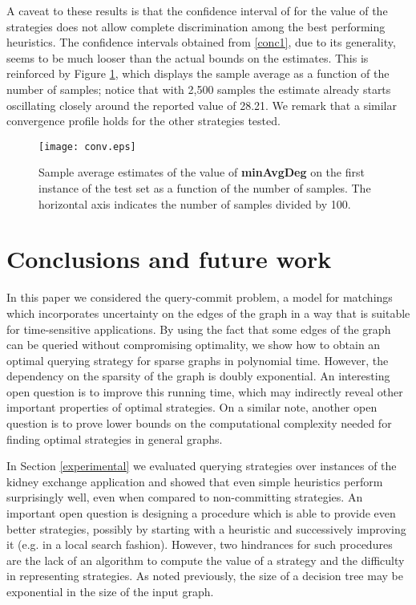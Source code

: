 \documentclass[12pt]{article}
\begin{document}
		A caveat to these results is that the confidence interval of  for the value of the strategies does not allow complete discrimination among the best performing heuristics. The confidence intervals obtained from \eqref{conc1}, due to its generality, seems to be much looser than the actual bounds on the estimates. This is reinforced by Figure \ref{fig:conv}, which displays the sample average as a function of the number of samples; notice that with 2,500 samples the estimate already starts oscillating closely around the reported value of 28.21. We remark that a similar convergence profile holds for the other strategies tested.
		
		
\begin{figure}
	\centering
		\texttt{[image: conv.eps]}
	\caption{Sample average estimates of the value of {\bf minAvgDeg} on the first instance of the test set as a function of the number of samples. The horizontal axis indicates the number of samples divided by 100.}
	\label{fig:conv}
\end{figure}

		\section{Conclusions and future work} \label{conclusion}
		
		In this paper we considered the query-commit problem, a model for matchings which incorporates uncertainty on the edges of the graph in a way that is suitable for time-sensitive applications. By using the fact that some edges of the graph can be queried without compromising optimality, we show how to obtain an optimal querying strategy for sparse graphs in polynomial time. However, the dependency on the sparsity of the graph is doubly exponential. An interesting open question is to improve this running time, which may indirectly reveal other important properties of optimal strategies. On a similar note, another open question is to prove lower bounds on the computational complexity needed for finding optimal strategies in general graphs. 
	
		In Section \ref{experimental} we evaluated querying strategies over instances of the kidney exchange application and showed that even simple heuristics perform surprisingly well, even when compared to non-committing strategies. An important open question is designing a procedure which is able to provide even better strategies, possibly by starting with a heuristic and successively improving it (e.g. in a local search fashion). However, two hindrances for such procedures are the lack of an algorithm to compute the value of a strategy and the difficulty in representing strategies. As noted previously, the size of a decision tree may be exponential in the size of the input graph. 
	
\end{document}
